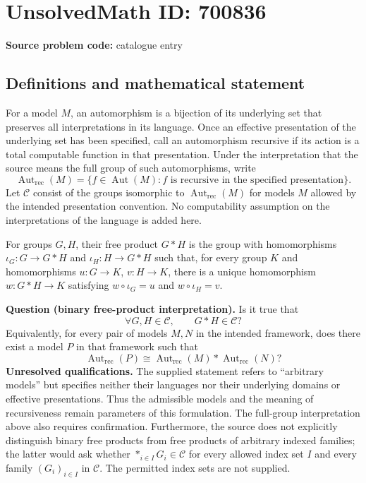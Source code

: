 \documentclass[11pt]{article}
\begin{document}
\section*{UnsolvedMath ID: 700836}
\textbf{Source problem code:} catalogue entry
\subsection{Definitions and mathematical statement}
For a model \(M\), an automorphism is a bijection of its underlying set that preserves all interpretations in its language. Once an effective presentation of the underlying set has been specified, call an automorphism recursive if its action is a total computable function in that presentation. Under the interpretation that the source means the full group of such automorphisms, write
\[
\operatorname{Aut}_{\mathrm{rec}}(M)
=\{f\in\operatorname{Aut}(M):f\text{ is recursive in the specified presentation}\}.
\]
Let \(\mathcal C\) consist of the groups isomorphic to \(\operatorname{Aut}_{\mathrm{rec}}(M)\) for models \(M\) allowed by the intended presentation convention. No computability assumption on the interpretations of the language is added here.

For groups \(G,H\), their free product \(G*H\) is the group with homomorphisms \(\iota_G:G\to G*H\) and \(\iota_H:H\to G*H\) such that, for every group \(K\) and homomorphisms \(u:G\to K\), \(v:H\to K\), there is a unique homomorphism \(w:G*H\to K\) satisfying \(w\circ\iota_G=u\) and \(w\circ\iota_H=v\).

\textbf{Question (binary free-product interpretation).} Is it true that
\[
\forall G,H\in\mathcal C,\qquad G*H\in\mathcal C?
\]
Equivalently, for every pair of models \(M,N\) in the intended framework, does there exist a model \(P\) in that framework such that
\[
\operatorname{Aut}_{\mathrm{rec}}(P)
\cong
\operatorname{Aut}_{\mathrm{rec}}(M)*\operatorname{Aut}_{\mathrm{rec}}(N)?
\]
\textbf{Unresolved qualifications.} The supplied statement refers to ``arbitrary models'' but specifies neither their languages nor their underlying domains or effective presentations. Thus the admissible models and the meaning of recursiveness remain parameters of this formulation. The full-group interpretation above also requires confirmation. Furthermore, the source does not explicitly distinguish binary free products from free products of arbitrary indexed families; the latter would ask whether \(\mathop{*}_{i\in I}G_i\in\mathcal C\) for every allowed index set \(I\) and every family \((G_i)_{i\in I}\) in \(\mathcal C\). The permitted index sets are not supplied.
\end{document}
